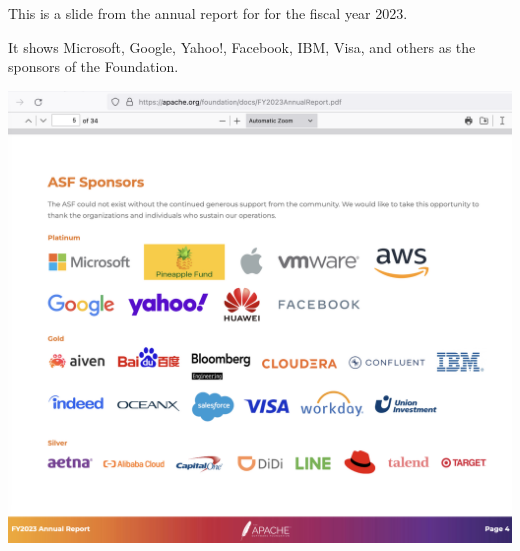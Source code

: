 
This is a slide from the annual report for \Asf for the fiscal year 2023.

It shows Microsoft, Google, Yahoo!, Facebook, IBM, Visa, and others as the sponsors of the Foundation.

\includegraphics[width=\textwidth]{apache-sponsors}

\pagebreak
